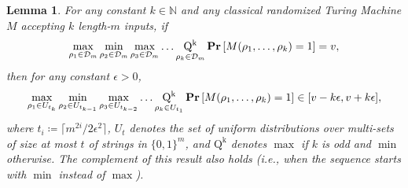 \documentclass[10pt,a4paper]{article}
\newtheorem{lemma}[theorem]{Lemma}
\theoremstyle{definition}
\renewcommand{\Pr}{\mathop{\bf Pr\/}}
\newcommand{\nats}{\mathbb N}
\newcommand{\N}{\nats}
\newcommand{\calD}{\mathcal{D}}
\begin{document}
\begin{lemma}\label{lem:lipton}
    For any constant $k \in \N$ and any classical randomized Turing Machine $M$ accepting $k$ length-$m$ inputs, if
    \[
        \max_{\rho_1 \in\calD_m} \min_{\rho_2 \in\calD_m} \max_{\rho_3 \in\calD_m} \dots \operatorname*{Q^k}_{\rho_k \in\calD_m} \Pr\left[M(\rho_1,\dots,\rho_k) = 1\right] = v,
    \]
    then
    for any constant $\epsilon>0$, 
    \[
        \max_{\rho_1\in U_{t_k}} \min_{\rho_2\in U_{t_{k-1}}} \max_{\rho_3 \in U_{t_{k-2}}} \dots \operatorname*{Q^k}_{\rho_k \in U_{t_{1}}} \Pr\left[M(\rho_1,\dots,\rho_k)=1\right] \in [v - k\epsilon, v+k\epsilon] ,
    \]
    where $t_i \coloneqq \lceil m^{2i}/2\epsilon^2 \rceil$, 
    $U_t$ denotes the set of uniform distributions over multi-sets of size at most $t$ of strings in $\{0,1\}^m$,
    and $\operatorname*{Q^k}$ denotes $\max$ if $k$ is odd and $\min$ otherwise.
    The complement of this result also holds (i.e., when the sequence starts with $\min$ instead of $\max$).
\end{lemma}
\end{document}
